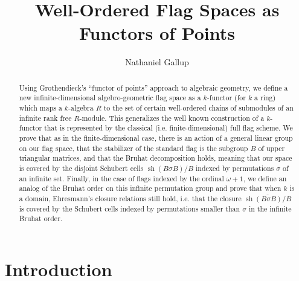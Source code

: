 \documentclass[oneside,11pt]{amsart}
\newcommand{\sh}{\operatorname{sh}}
\theoremstyle{definition}
\newtheorem{proof techniques}{Proof Techniques}
\begin{document}
\title{Well-Ordered Flag Spaces as Functors of Points}
\author{Nathaniel Gallup}
\date{}
\maketitle


\begin{abstract}
Using Grothendieck's ``functor of points'' approach to algebraic geometry, we define a new infinite-dimensional algebro-geometric flag space as a $k$-functor (for $k$ a ring) which maps a $k$-algebra $R$ to the set of certain well-ordered chains of submodules of an infinite rank free $R$-module. This generalizes the well known construction of a $k$-functor that is represented by the classical (i.e. finite-dimensional) full flag scheme. We prove that as in the finite-dimensional case, there is an action of a general linear group on our flag space, that the stabilizer of the standard flag is the subgroup $B$ of upper triangular matrices, and that the Bruhat decomposition holds, meaning that our space is covered by the disjoint Schubert cells $\sh(B \sigma B) / B$ indexed by permutations $\sigma$ of an infinite set. Finally, in the case of flags indexed by the ordinal $\omega + 1$, we define an analog of the Bruhat order on this infinite permutation group and prove that when $k$ is a domain, Ehresmann's closure relations still hold, i.e. that the closure $\overline{\sh(B \sigma B) / B}$ is covered by the Schubert cells indexed by permutations smaller than $\sigma$ in the infinite Bruhat order. 
\end{abstract} 



\section{Introduction}
\end{document}
